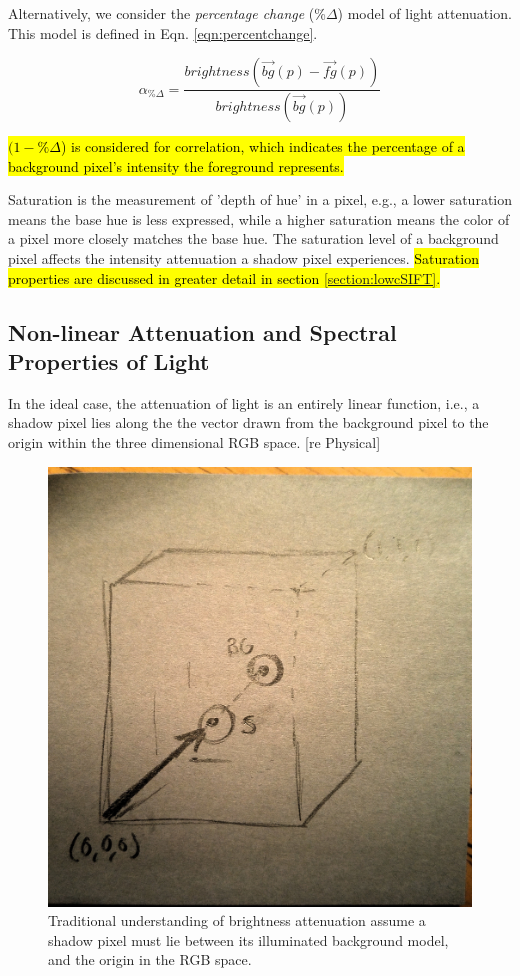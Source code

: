 \documentclass[12pt]{report}
\begin{document}
Alternatively, we consider the \textit{percentage change} (\%$\Delta$) model of light attenuation. This model is defined in Eqn. \ref{eqn:percentchange}.

\begin{equation}
\alpha_{\%\Delta} = \dfrac{brightness(\vec{bg}(p) - \vec{fg}(p))}{brightness(\vec{bg}(p))}
\label{eqn:percentchange}
\end{equation}

\hl{$(1 - \%\Delta$) is considered for correlation, which indicates the percentage of a background pixel's intensity the foreground represents.}

Saturation is the measurement of 'depth of hue' in a pixel, e.g., a lower saturation means the base hue is less expressed, while a higher saturation means the color of a pixel more closely matches the base hue. The saturation level of a background pixel affects the intensity attenuation a shadow pixel experiences. \hl{Saturation properties are discussed in greater detail in section \ref{section:lowcSIFT}.}

\subsection{Non-linear Attenuation and Spectral Properties of Light} \label{section:nonlinearatten}

In the ideal case, the attenuation of light is an entirely linear function, i.e., a shadow pixel lies along the the vector drawn from the background pixel to the origin within the three dimensional RGB space. [re Physical]

\begin{figure}
  \centering
 \includegraphics[width=.5\linewidth]{figures/mockup_rgbcube.jpg}
  \caption{Traditional understanding of brightness attenuation assume a shadow pixel must lie between its illuminated background model, and the origin in the RGB space.}
  \label{fig:rgbcube}
\end{figure}
\end{document}
